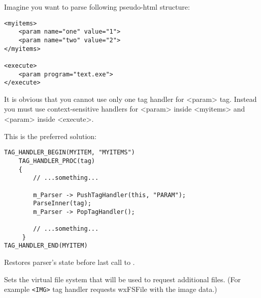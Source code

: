 


Imagine you want to parse following pseudo-html structure:

\begin{verbatim}
<myitems>
    <param name="one" value="1">
    <param name="two" value="2">
</myitems>

<execute>
    <param program="text.exe">
</execute>
\end{verbatim}

It is obvious that you cannot use only one tag handler for <param> tag.
Instead you must use context-sensitive handlers for <param> inside <myitems>
and <param> inside <execute>.        

This is the preferred solution:

\begin{verbatim}
TAG_HANDLER_BEGIN(MYITEM, "MYITEMS")
    TAG_HANDLER_PROC(tag)
    {
        // ...something...

        m_Parser -> PushTagHandler(this, "PARAM");
        ParseInner(tag);
        m_Parser -> PopTagHandler();

        // ...something...
     }
TAG_HANDLER_END(MYITEM)
\end{verbatim}


\label{wxhtmlparserpoptaghandler}


Restores parser's state before last call to 
.


\label{wxhtmlparsersetfs}


Sets the virtual file system that will be used to request additional
files. (For example {\tt <IMG>} tag handler requests wxFSFile with the
image data.)

